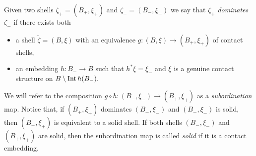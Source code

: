 \documentclass[12pt]{paper}
\theoremstyle{plain}
\theoremstyle{definition}
\newcommand{\wt}{\widetilde}
\newcommand{\Int}{{\rm Int\,}} %
\newcommand{\FF}{\mathcal{F}}
\numberwithin{figure}{section}
\begin{document}
Given two shells $\zeta_+=(B_+,\xi_+)$ and $\zeta_-=(B_-,\xi_-)$ we say that 
$\zeta_+$ {\em dominates} $\zeta_-$ if there exists both
\begin{itemize}
\item a shell $\wt\zeta=\left( B, \xi\right)$ with an equivalence $g:(B,\xi)\to (B_+,\xi_+)$ of contact shells,
\item an embedding $h:  B_- \to  B$ such that $h^*\xi=\xi_-$ and
   $ \xi$ is a genuine  contact structure on $ B \setminus \Int h(B_-).$
  \end{itemize}
   We will refer to the composition 
   $g\circ h:(B_-,\xi_-)\to (B_+,\xi_+)$ as a {\em subordination} map.
Notice that, if $ (B_+,\xi_+)$ dominates $(B_-,\xi_-)$ and $(B_-,\xi_-)$ is solid, then $ (B_+,\xi_+)$ is equivalent to a solid shell. If  both  shells $(B_-,\xi_-)$ and $ (B_+,\xi_+)$ are solid, then the subordination map is called {\em solid} if it is a contact embedding.
  
  
  
  
  
\end{document}
